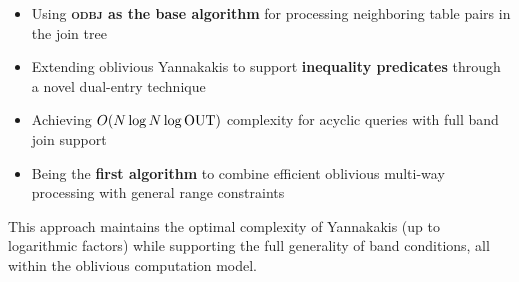 \begin{itemize}
\item Using \textbf{\textsc{odbj} as the base algorithm} for processing neighboring table pairs in the join tree

\item Extending oblivious Yannakakis to support \textbf{inequality predicates} through a novel dual-entry technique

\item Achieving $O(N \log N \log \text{OUT})$ complexity for acyclic queries with full band join support

\item Being the \textbf{first algorithm} to combine efficient oblivious multi-way processing with general range constraints
\end{itemize}

This approach maintains the optimal complexity of Yannakakis (up to logarithmic factors) while supporting the full generality of band conditions, all within the oblivious computation model.